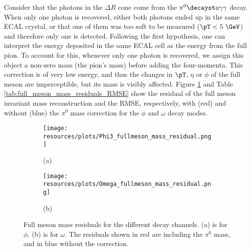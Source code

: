 Consider that the photons in the $\Delta R$ cone come from the $\pi^{0}\decaysto\gamma\gamma$ decay. When only one photon is recovered, either both photons ended up in the same ECAL crystal, or that one of them was too soft to be measured ($\pT < 5\ \GeV$) and therefore only one is detected. Following the first hypothesis, one can interpret the energy deposited in the same ECAL cell as the energy from the full pion. To account for this, whenever only one photon is recovered, we assign this object a non-zero mass (the pion's mass) before adding the four-momenta. This correction is of very low energy, and thus the changes in $\pT$, $\eta$ or $\phi$ of the full meson are imperceptible, but its mass is visibly affected. Figure \ref{fig:full_meson_mass_residuals} and Table \ref{tab:full_meson_mass_residuals_RMSE} show the residual of the full meson invariant mass reconstruction and the RMSE, respectively, with (red) and without (blue) the $\pi^0$ mass correction for the $\phi$ and $\omega$ decay modes.
\begin{figure}[!ht]
    \captionsetup[subfigure]{labelformat=empty}
    \vspace*{-0.2cm}
    \centering
    \setlength{\mylength}{\textwidth}
    \begin{subfigure}[t]{0.50\mylength}
            \centering
            \texttt{[image: resources/plots/Phi3\_fullmeson\_mass\_residual.png]}
            \vspace*{-0.2cm}
            \caption{\footnotesize (a)}
    \end{subfigure}%
    \begin{subfigure}[t]{0.50\mylength}
            \centering
            \texttt{[image: resources/plots/Omega\_fullmeson\_mass\_residual.png]}
            \vspace*{-0.2cm}
            \caption{\footnotesize (b)}
    \end{subfigure}%
    \caption{Full meson mass residuals for the different decay channels. (a) is for $\phi$, (b) is for $\omega$. The residuals shown in red are including the $\pi^0$ mass, and in blue without the correction.}
    \label{fig:full_meson_mass_residuals}
    \vspace*{-0.0cm}
\end{figure}

